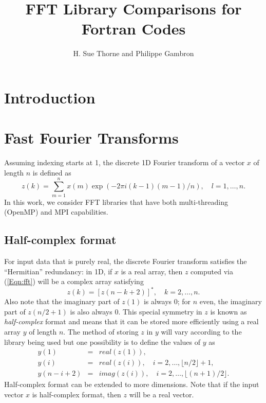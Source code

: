 \documentclass[a4paper]{article}
\begin{document}
\title{FFT Library Comparisons for Fortran Codes}
\author{H. Sue Thorne and Philippe Gambron}

\maketitle


\section{Introduction}


\section{Fast Fourier Transforms}\label{Sec:FFT}


Assuming indexing starts at 1, the discrete 1D Fourier transform of a
vector $x$ of length $n$ is defined as
\begin{equation}\label{Eqn:fft}
  z(k) = \sum_{m=1}^{n} x(m) \exp(-2\pi i (k-1) (m-1) / n), \quad l=1,\ldots,n.
\end{equation}
In this work, we consider FFT libraries that have both multi-threading
(OpenMP) and MPI capabilities.

\subsection{Half-complex format}
For input data that is purely real, the discrete Fourier transform satisfies 
the ``Hermitian'' redundancy: in 1D, if $x$ is a real array, then $z$ computed 
via (\ref{Eqn:fft}) will be a complex array satisfying
$$z(k) = \left[z(n-k+2)\right]^*, \quad k=2,\ldots,n.$$ Also note that the 
imaginary part of $z(1)$ is always 0; for $n$ even, the imaginary part of 
$z(n/2 + 1) $ is also always 0. This special symmetry in $z$ is known as 
\textit{half-complex} format and means that it can 
be stored more efficiently using a real array $y$ of length $n.$ The method of 
storing $z$ in $y$ will vary according to the library being used but one 
possibility is to define the values of $y$ as
\begin{eqnarray*}
y(1) & = & real(z(1)),\\
y(i) & = & real(z(i)), \quad i=2,\ldots,\lfloor n/2 \rfloor +1,\\
y(n-i+2) & = & imag(z(i)), \quad i=2,\ldots, \lfloor (n+1)/2  \rfloor.
\end{eqnarray*} 
Half-complex format can 
be extended to more dimensions. Note that if the input vector $x$ is 
half-complex format, then $z$ will be a real vector.
\end{document}
